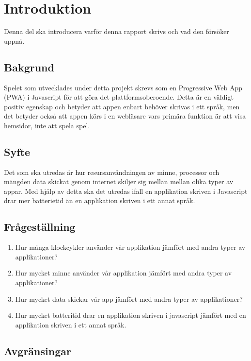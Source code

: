 \section{Introduktion}
\label{sec:joel_a-introduction}
Denna del ska introducera varför denna rapport skrivs och vad den försöker uppnå.

\subsection{Bakgrund}
Spelet som utvecklades under detta projekt skrevs som en Progressive Web App (PWA) i Javascript för att göra det plattformsoberoende.  Detta är en väldigt positiv egenskap och betyder att appen enbart behöver skrivas i ett språk, men det betyder också att appen körs i en webläsare vars primära funktion är att visa hemsidor, inte att spela spel. 


\subsection{Syfte}
Det som ska utredas är hur resursanvändningen av minne, processor och mängden data skickat genom internet skiljer sig mellan mellan olika typer av appar. Med hjälp av detta ska det utredas ifall en applikation skriven i Javascript drar mer batterietid än en applikation skriven i ett annat språk.

\subsection{Frågeställning}
\label{subsec:joel_a-research-questions}

\begin{enumerate}
\item Hur många klockcykler använder vår applikation jämfört med andra typer av applikationer?

\item Hur mycket minne använder vår applikation jämfört med andra typer av applikationer?

\item Hur mycket data skickar vår app jämfört med andra typer av applikationer?

\item Hur mycket batteritid drar en applikation skriven i javascript jämfört med en applikation skriven i ett annat språk.

\end{enumerate}

\subsection{Avgränsingar}
\label{subsec:joel_a-delimitations}

